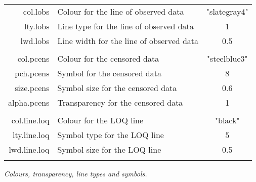 \begin{table}[!h]
\begin{center}
\begin{tabular}{| r p{8cm} c|}
{\ttfamily col.lobs} & Colour for the line of observed data & "slategray4"  \\
{\ttfamily lty.lobs} & Line type for the line of observed data &  1 \\
{\ttfamily lwd.lobs} & Line width  for the line of observed data & 0.5  \\
{\ttfamily } & &  \\
{\ttfamily col.pcens} & Colour for the censored data  & "steelblue3"  \\
{\ttfamily pch.pcens} & Symbol for the censored data  &  8 \\
{\ttfamily size.pcens} & Symbol size for the censored data  &  0.6 \\
{\ttfamily alpha.pcens} &Transparency for the censored data & 1  \\
{\ttfamily } & &  \\
{\ttfamily col.line.loq} & Colour for the LOQ line  & "black"  \\
{\ttfamily lty.line.loq} & Symbol type for the LOQ line &  5 \\
{\ttfamily lwd.line.loq} & Symbol size for the LOQ line &  0.5 \\
{\ttfamily } & &  \\
\hline
\end{tabular} 
\end{center}
 {\itshape Colours, transparency, line types and symbols.}
\end{table} 

\clearpage

